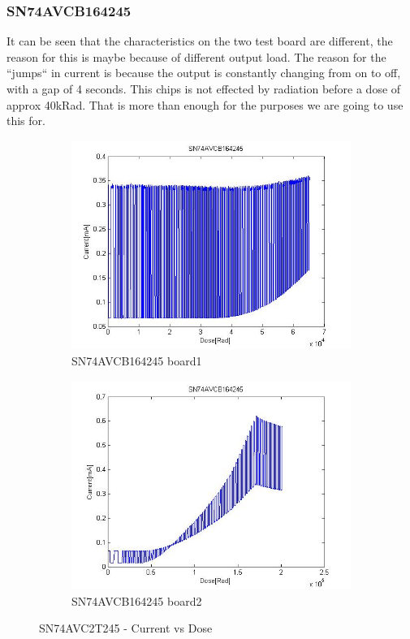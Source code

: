 \documentclass[12pt]{article}
\numberwithin{figure}{section}
\begin{document}
\FloatBarrier

\subsubsection{SN74AVCB164245}

It can be seen that the characteristics on the two test board are different, the reason for this is maybe because of different output load. The reason for the ``jumps`` in current is because the output is constantly changing from on to off, with a gap of 4 seconds.
This chips is not effected by radiation before a dose of approx 40kRad. That is more than enough for the purposes we are going to use this for.

\begin{figure}[!htbp]
\centering
  \begin{subfigure}{.49\textwidth}
  \centering
  \includegraphics[width=\linewidth]{current_4245.jpg}
  \caption{SN74AVCB164245 board1}
  \label{SN74AVCB164245_1}
  \end{subfigure}
  \begin{subfigure}{.49\textwidth}
  \centering
  \includegraphics[width=\linewidth]{current_dose_42452.jpg}
  \caption{SN74AVCB164245 board2}
  \label{SN74AVCB164245_2}
  \end{subfigure}
 \caption{SN74AVC2T245 - Current vs Dose}
\end{figure}
\end{document}
